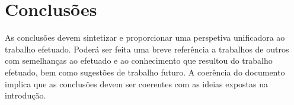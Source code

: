 \chapter{Conclusões}\label{cap:conclusions}

As conclusões devem sintetizar e proporcionar uma perspetiva unificadora ao trabalho efetuado. Poderá ser feita uma breve referência a trabalhos de outros com semelhanças ao efetuado e ao conhecimento que resultou do trabalho efetuado, bem como sugestões de trabalho futuro. A coerência do documento implica que as conclusões devem ser coerentes com as ideias expostas na introdução.